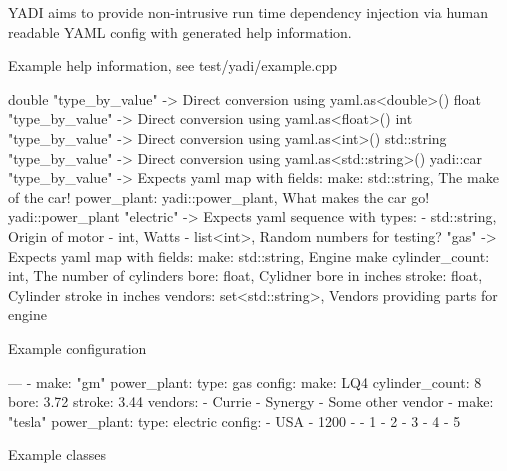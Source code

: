 Y\+A\+DI aims to provide non-\/intrusive run time dependency injection via human readable Y\+A\+ML config with generated help information.

Example help information, see test/yadi/example.\+cpp


\begin{DoxyCode}
double
    "type\_by\_value" -> Direct conversion using yaml.as<double>()
float
    "type\_by\_value" -> Direct conversion using yaml.as<float>()
int
    "type\_by\_value" -> Direct conversion using yaml.as<int>()
std::string
    "type\_by\_value" -> Direct conversion using yaml.as<std::string>()
yadi::car
    "type\_by\_value" -> Expects yaml map with fields:
        make: std::string, The make of the car!
        power\_plant: yadi::power\_plant, What makes the car go!
yadi::power\_plant
    "electric" -> Expects yaml sequence with types:
         - std::string, Origin of motor
         - int, Watts
         - list<int>, Random numbers for testing?
    "gas" -> Expects yaml map with fields:
        make: std::string, Engine make
        cylinder\_count: int, The number of cylinders
        bore: float, Cylidner bore in inches
        stroke: float, Cylinder stroke in inches
        vendors: set<std::string>, Vendors providing parts for engine
\end{DoxyCode}
 Example configuration 
\begin{DoxyCode}
---
- make: "gm"
  power\_plant:
    type: gas
    config:
      make: LQ4
      cylinder\_count: 8
      bore: 3.72
      stroke: 3.44
      vendors:
        - Currie
        - Synergy
        - Some other vendor
- make: "tesla"
  power\_plant:
    type: electric
    config:
      - USA
      - 1200
      - - 1
        - 2
        - 3
        - 4
        - 5
\end{DoxyCode}
 Example classes 

